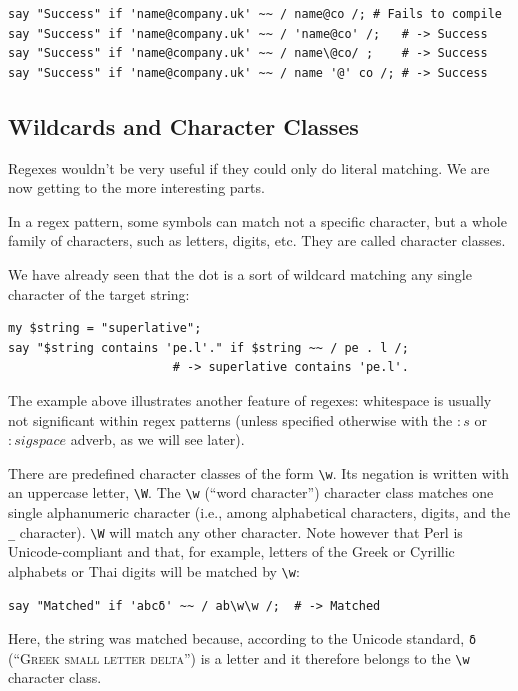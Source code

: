 \begin{verbatim}
say "Success" if 'name@company.uk' ~~ / name@co /; # Fails to compile
say "Success" if 'name@company.uk' ~~ / 'name@co' /;   # -> Success
say "Success" if 'name@company.uk' ~~ / name\@co/ ;    # -> Success
say "Success" if 'name@company.uk' ~~ / name '@' co /; # -> Success
\end{verbatim}
%


\subsection{Wildcards and Character Classes}

Regexes wouldn't be very useful if they could only do literal 
matching. We are now getting to the more interesting parts.

In a regex pattern, some symbols can match not a specific character, 
but a whole family of characters, such as letters, digits, etc. 
They are called character classes.

We have already seen that the dot is a sort of wildcard 
matching any single character of the target string:

\begin{verbatim}
my $string = "superlative";
say "$string contains 'pe.l'." if $string ~~ / pe . l /;
                       # -> superlative contains 'pe.l'.
\end{verbatim}
%

The example above illustrates another feature of regexes: 
whitespace is usually not significant within regex patterns 
(unless specified otherwise with the $:s$ or $:sigspace$ 
adverb, as we will see later).

There are predefined character classes of the form \verb'\w'. 
Its negation is written with an uppercase letter, \verb'\W'. 
The \verb'\w' (``word character'') character class  
matches one single alphanumeric character (i.e., among alphabetical 
characters, digits, and the \verb'_' character). \verb'\W' will match 
any other character. Note however that Perl is Unicode-compliant 
and that, for example, letters of the Greek or Cyrillic alphabets or 
Thai digits will be matched by \verb'\w':

\begin{verbatim}
say "Matched" if 'abcδ' ~~ / ab\w\w /;  # -> Matched
\end{verbatim}
%

Here, the string was matched because, according to the 
Unicode standard, \verb'δ' (``\textsc{Greek small letter 
delta}'') is a letter and it therefore belongs to 
the \verb'\w' character class.

